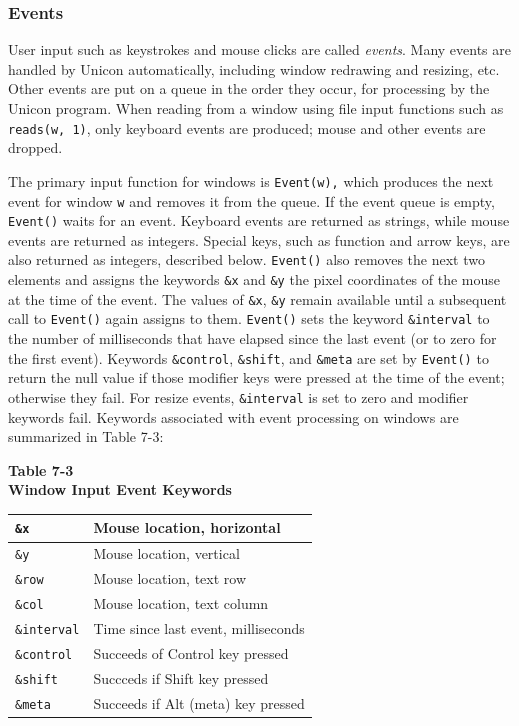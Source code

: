 \subsubsection{Events}

User input such as keystrokes and mouse clicks are called
\textit{events}. Many events are handled by Unicon automatically,
including window redrawing and resizing, etc.
Other events are put on a queue in the order they occur, for
processing by the Unicon program. When reading from a window using file
input functions such as \texttt{reads(w, 1)}, only keyboard events are
produced; mouse and other events are dropped.

The primary input function for windows is \texttt{Event(w),} which
produces the next event for window \texttt{w} and removes it from the
queue. If the event queue is empty, \texttt{Event()} waits for an
event. Keyboard events are returned as strings, while mouse events are
returned as integers. Special keys, such as function and arrow keys,
are also returned as integers, described below. \texttt{Event()} also
removes the next two elements and assigns the keywords \texttt{\&x} and
\texttt{\&y} the pixel coordinates of the mouse at the time of the
event. The values of \texttt{\&x}, \texttt{\&y} remain available until
a subsequent call to \texttt{Event()} again assigns to them.
\texttt{Event()} sets the keyword \texttt{\&interval} to the number of
milliseconds that have elapsed since the last event (or to zero for the
first event). Keywords \texttt{\&control}, \texttt{\&shift}, and
\texttt{\&meta} are set by \texttt{Event()} to return the null value if
those modifier keys were pressed at the time of the event; otherwise
they fail. For resize events, \texttt{\&interval} is set to zero and
modifier keywords fail. Keywords associated with event processing on
windows are summarized in Table 7-3:

\begin{center}
{\sffamily\bfseries Table 7-3} \\
{\sffamily\bfseries Window Input Event Keywords}

\begin{supertabular}{|m{0.90in}|m{2.7in}|}
\texttt{\&x} &
Mouse location, horizontal\\\hline
\texttt{\&y} &
Mouse location, vertical\\\hline
\texttt{\&row} &
Mouse location, text row\\\hline
\texttt{\&col} &
Mouse location, text column\\\hline
\texttt{\&interval} &
Time since last event, milliseconds\\\hline
\texttt{\&control} &
Succeeds of Control key pressed\\\hline
\texttt{\&shift} &
Succceds if Shift key pressed\\\hline
\texttt{\&meta} &
Succeeds if Alt (meta) key pressed\\\hline
\end{supertabular}
\end{center}

